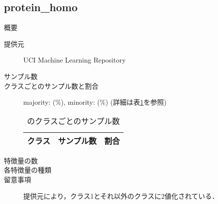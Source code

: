 \subsection{protein\_homo}
\begin{description}
    \item[概要] \cite{}
    \item[提供元] UCI Machine Learning Repository
    \item[サンプル数] 
    \item[クラスごとのサンプル数と割合] majority:  (\%), minority:  (\%) (詳細は表\ref{tab:}を参照)

        \begin{table}[htbp]
            \centering
            \caption{のクラスごとのサンプル数}
            \label{tab:}
            \begin{tabular}{lrc} \hline
                \multicolumn{1}{c}{クラス}&
                \multicolumn{1}{c}{サンプル数}&
                \multicolumn{1}{c}{割合}\\
                \hline
                \hline

                \hline
            \end{tabular}
        \end{table}

    \item[特徴量の数] 
    \item[各特徴量の種類] \mbox{}
        
    \item[留意事項] 提供元により，クラス1とそれ以外のクラスに2値化されている．
\end{description}


\newpage
